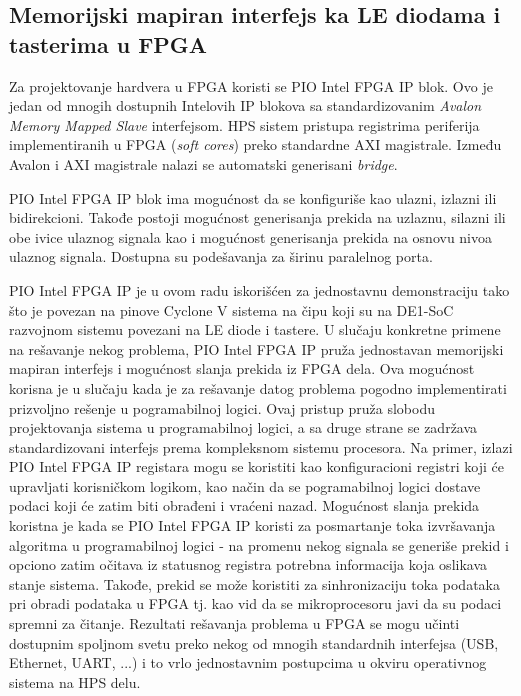 \subsection{Memorijski mapiran interfejs ka LE diodama i tasterima u FPGA}
Za projektovanje hardvera u FPGA koristi se PIO Intel FPGA IP blok. Ovo je jedan od mnogih dostupnih Intelovih IP blokova sa standardizovanim \textit{Avalon Memory Mapped Slave} interfejsom. HPS sistem pristupa registrima periferija implementiranih u FPGA (\textit{soft cores}) preko standardne AXI magistrale. Između Avalon i AXI magistrale nalazi se automatski generisani \textit{bridge}.

PIO Intel FPGA IP blok ima mogućnost da se konfiguriše kao ulazni, izlazni ili bidirekcioni. Takođe postoji mogućnost generisanja prekida na uzlaznu, silazni ili obe ivice ulaznog signala kao i mogućnost generisanja prekida na osnovu nivoa ulaznog signala. Dostupna su podešavanja za širinu paralelnog porta.

PIO Intel FPGA IP je u ovom radu iskorišćen za jednostavnu demonstraciju tako što je povezan na pinove Cyclone V sistema na čipu koji su na DE1-SoC razvojnom sistemu povezani na LE diode i tastere. U slučaju konkretne primene na rešavanje nekog problema, PIO Intel FPGA IP pruža jednostavan memorijski mapiran interfejs i mogućnost slanja prekida iz FPGA dela. Ova mogućnost korisna je u slučaju kada je za rešavanje datog problema pogodno implementirati prizvoljno rešenje u pogramabilnoj logici. Ovaj pristup pruža slobodu projektovanja sistema u programabilnoj logici, a sa druge strane se zadržava standardizovani interfejs prema kompleksnom sistemu procesora. Na primer, izlazi PIO Intel FPGA IP registara mogu se koristiti kao konfiguracioni registri koji će upravljati korisničkom logikom, kao način da se pogramabilnoj logici dostave podaci koji će zatim biti obrađeni i vraćeni nazad. Mogućnost slanja prekida koristna je kada se PIO Intel FPGA IP koristi za posmartanje toka izvršavanja algoritma u programabilnoj logici - na promenu nekog signala se generiše prekid i opciono zatim očitava iz statusnog registra potrebna informacija koja oslikava stanje sistema. Takođe, prekid se može koristiti za sinhronizaciju toka podataka pri obradi podataka u FPGA tj. kao vid da se mikroprocesoru javi da su podaci spremni za čitanje. Rezultati rešavanja problema u FPGA se mogu učinti dostupnim spoljnom svetu preko nekog od mnogih standardnih interfejsa (USB, Ethernet, UART, ...) i to vrlo jednostavnim postupcima u okviru operativnog sistema na HPS delu.

